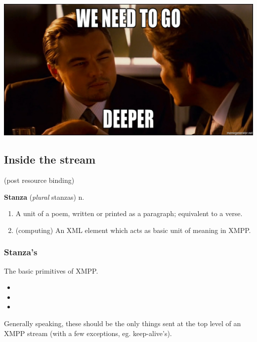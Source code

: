 \documentclass[xelatex,aspectratio=169]{beamer}
\begin{document}
\begin{frame}
	\vspace*{\fill}
	\includegraphics[width=.75\textwidth]{images/deeper.jpg}
\end{frame}

\subsection[]{Inside the stream}
\begin{frame}
\subsectionpage
\centerline{(post resource binding)}
\end{frame}

\begin{frame}
\vspace*{\fill}
\textbf{Stanza}  (\kern1pt\textit{plural} stanzas) n.
\begin{enumerate}
	\item A unit of a poem, written or printed as a paragraph; equivalent to a verse.
	\item (computing) An XML element which acts as basic unit of meaning in XMPP.
\end{enumerate}
\vspace*{\fill}
\end{frame}

\begin{frame}
	\frametitle{Stanza's}
	The basic primitives of XMPP.
	\begin{itemize}
		\item {}
		\item {}
		\item {}
	\end{itemize}

	Generally speaking, these should be the only things sent at the top level of
	an XMPP stream (with a few exceptions, eg.  keep-alive's).
\end{frame}
\end{document}
